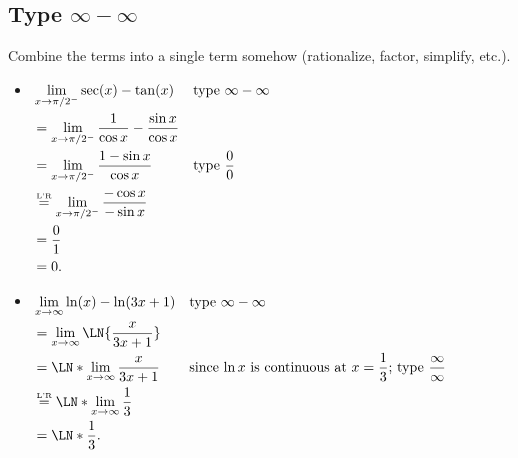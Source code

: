\subsection*{Type $ \infty-\infty$}
Combine the terms into a single term somehow (rationalize, factor, simplify, etc.).
\begin{Example}{}{}
    \begin{itemize}
        \item $ \begin{aligned}[t]
                       & \lim\limits_{{x} \to {\pi/2^-}}\sec(x)-\tan(x)                         &  & \text{type }\infty-\infty \\
                       & =\lim\limits_{{x} \to {\pi/2^-}}\frac{1}{\cos x}-\frac{\sin x}{\cos x}                                \\
                       & =\lim\limits_{{x} \to {\pi/2^-}}\frac{1-\sin x}{\cos x}                &  & \text{type }\frac{0}{0}   \\
                       & \stackrel{\text{\tiny L'R}}{=} \lim\limits_{{x} \to {\pi/2^-}}\frac{-\cos x}{-\sin x}                                           \\
                       & =\frac{0}{1}                                                                                          \\
                       & =0.
                  \end{aligned} $
        \item $\begin{aligned}[t]
                       & \lim\limits_{{x} \to {\infty}}\ln(x)-\ln(3x+1)      &  & \text{type }\infty-\infty                                                         \\
                       & =\lim\limits_{{x} \to {\infty}}\LN{\frac{x}{3x+1}}                                                                                         \\
                       & =\LN*{\lim\limits_{{x} \to {\infty}}\frac{x}{3x+1}} &  & \text{since $\ln x$ is continuous at $x=\frac{1}{3}$; type }\frac{\infty}{\infty} \\
                       & \LHR\LN*{\lim\limits_{{x} \to {\infty}}\frac{1}{3}}                                                                                        \\
                       & =\LN*{\frac{1}{3}}.
                  \end{aligned}$
    \end{itemize}
\end{Example}
